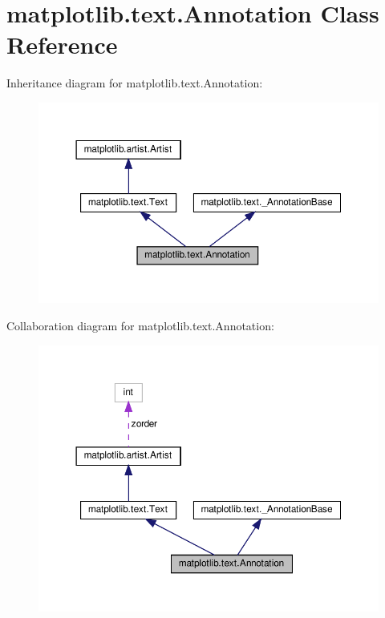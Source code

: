 \hypertarget{classmatplotlib_1_1text_1_1Annotation}{}\section{matplotlib.\+text.\+Annotation Class Reference}
\label{classmatplotlib_1_1text_1_1Annotation}


Inheritance diagram for matplotlib.\+text.\+Annotation\+:
\nopagebreak
\begin{figure}[H]
\begin{center}
\leavevmode
\includegraphics[width=350pt]{classmatplotlib_1_1text_1_1Annotation__inherit__graph}
\end{center}
\end{figure}


Collaboration diagram for matplotlib.\+text.\+Annotation\+:
\nopagebreak
\begin{figure}[H]
\begin{center}
\leavevmode
\includegraphics[width=350pt]{classmatplotlib_1_1text_1_1Annotation__coll__graph}
\end{center}
\end{figure}
